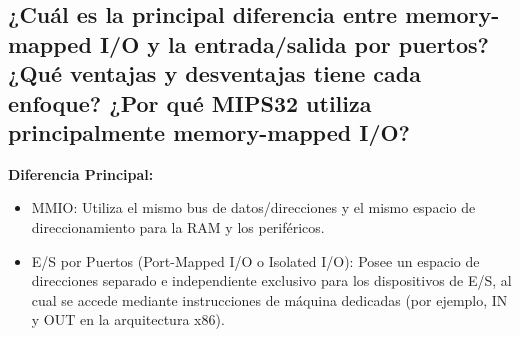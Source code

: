 \documentclass[12pt, a4paper]{article}
\begin{document}
    
\subsection{¿Cuál es la principal diferencia entre memory-mapped I/O y la entrada/salida por puertos? ¿Qué ventajas y desventajas tiene cada enfoque? ¿Por qué MIPS32 utiliza principalmente memory-mapped I/O?}
   \textbf{Diferencia Principal:}
   \begin{itemize}
       \item MMIO: Utiliza el mismo bus de datos/direcciones y el mismo espacio de direccionamiento para la RAM y los periféricos.
        \item E/S por Puertos (Port-Mapped I/O o Isolated I/O): Posee un espacio de direcciones separado e independiente exclusivo para los dispositivos de E/S, al cual se accede mediante instrucciones de máquina dedicadas (por ejemplo, IN y OUT en la arquitectura x86).
   \end{itemize}
    
\end{document}
